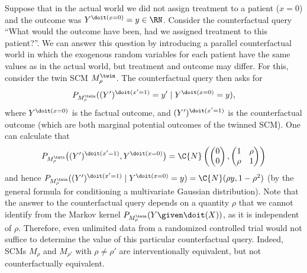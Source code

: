 \begin{Eg}
Suppose that in the actual world we did not assign treatment to a patient ($x=0$) and the outcome was $Y^{\doit(x=0)}=y \in\RN$.
Consider the counterfactual query ``What would the outcome have been, had we assigned treatment to this patient?''. 
We can answer this question by introducing a parallel counterfactual world in which the exogenous random variables for each
patient have the same values as in the actual world, but treatment and outcome may differ. For this, consider the
twin SCM $M_{\rho}^{\twin}$.
The counterfactual query then asks for 
  $$P_{M_{\rho}^{\twin}}((Y')^{\doit(x'=1)}=y'\mid Y^{\doit(x=0)}=y),$$
where $Y^{\doit(x=0)}$ is the factual outcome, and $(Y')^{\doit(x'=1)}$ is the counterfactual outcome (which are both marginal potential outcomes of the twinned SCM). One can calculate that
$$
  P_{M_{\rho}^{\twin}}\big((Y')^{\doit(x'=1)},Y^{\doit(x=0)}\big) = \C{N}\left(\begin{pmatrix}0\\ 0\end{pmatrix}, \begin{pmatrix} 1 & \rho \\ \rho & 1 \end{pmatrix}\right)
$$
and hence $P_{M_{\rho}^{\twin}}((Y')^{\doit(x'=1)} \mid Y^{\doit(x=0)}=y) = \C{N}(\rho y,1-\rho^2)$ (by the general formula for conditioning a multivariate Gaussian distribution). Note that the answer to the counterfactual query depends on a quantity $\rho$ that we cannot identify from the Markov kernel $P_{M_{\rho}^{\twin}}(Y\given \doit (X))$, as it is independent of $\rho$. Therefore, even unlimited data from a randomized controlled trial would not suffice to determine the value of this particular counterfactual query.
Indeed, SCMs $M_{\rho}$ and $M_{\rho'}$ with $\rho\neq\rho'$ are interventionally equivalent, but not counterfactually equivalent.
\end{Eg}
